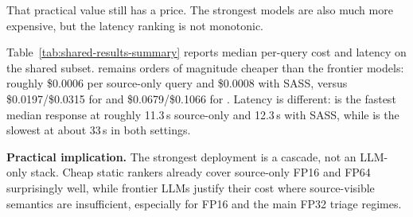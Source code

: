 That practical value still has a price.
The strongest models are also much more expensive, but the latency ranking is not monotonic.

Table~\ref{tab:shared-results-summary} reports median per-query cost and latency on the shared subset.
\gptoss remains orders of magnitude cheaper than the frontier models: roughly \$0.0006 per source-only query and \$0.0008 with SASS, versus \$0.0197/\$0.0315 for \gptfivefour and \$0.0679/\$0.1066 for \opus.
Latency is different: \gptfivefour is the fastest median response at roughly 11.3\,s source-only and 12.3\,s with SASS, while \gptoss is the slowest at about 33\,s in both settings.

\textbf{Practical implication.}
The strongest deployment is a cascade, not an LLM-only stack.
Cheap static rankers already cover source-only FP16 and \sourcesass FP64 surprisingly well, while frontier LLMs justify their cost where source-visible semantics are insufficient, especially for \sourcesass FP16 and the main FP32 triage regimes.
